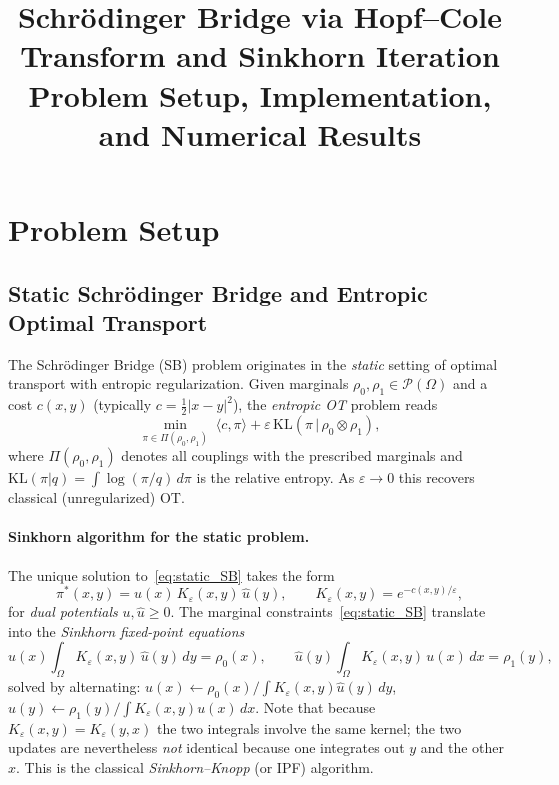 \documentclass[11pt,a4paper]{article}
\title{%
  \textbf{Schr\"{o}dinger Bridge via Hopf--Cole Transform and Sinkhorn Iteration}\\[6pt]
  \large Problem Setup, Implementation, and Numerical Results
}
\author{}
\date{}
\newcommand{\eps}{\varepsilon}
\begin{document}
\maketitle
\tableofcontents
\bigskip

\section{Problem Setup}

\subsection{Static Schr\"{o}dinger Bridge and Entropic Optimal Transport}

The Schr\"{o}dinger Bridge (SB) problem originates in the \emph{static}
setting of optimal transport with entropic regularization.
Given marginals $\rho_0, \rho_1 \in \mathcal{P}(\Omega)$ and a cost
$c(x,y)$ (typically $c = \tfrac{1}{2}|x-y|^2$), the
\emph{entropic OT} problem reads
\begin{equation}\label{eq:static_SB}
  \min_{\pi \in \Pi(\rho_0,\rho_1)}\;
    \langle c,\pi\rangle + \eps\,\mathrm{KL}(\pi\,|\,\rho_0\otimes\rho_1),
\end{equation}
where $\Pi(\rho_0,\rho_1)$ denotes all couplings with the prescribed
marginals and $\mathrm{KL}(\pi|q) = \int \log(\pi/q)\,d\pi$ is the
relative entropy.
As $\eps\to 0$ this recovers classical (unregularized) OT.

\paragraph{Sinkhorn algorithm for the static problem.}
The unique solution to~\eqref{eq:static_SB} takes the form
\begin{equation}\label{eq:static_factorization}
  \pi^*(x,y) = u(x)\,K_\eps(x,y)\,\hat{u}(y),
  \qquad K_\eps(x,y) = e^{-c(x,y)/\eps},
\end{equation}
for \emph{dual potentials} $u, \hat{u} \ge 0$.
The marginal constraints~\eqref{eq:static_SB} translate into the
\emph{Sinkhorn fixed-point equations}
\begin{equation}\label{eq:sinkhorn_static}
  u(x)\int_\Omega K_\eps(x,y)\,\hat{u}(y)\,dy = \rho_0(x),
  \qquad
  \hat{u}(y)\int_\Omega K_\eps(x,y)\,u(x)\,dx = \rho_1(y),
\end{equation}
solved by alternating:
$u(x) \leftarrow \rho_0(x)\big/\!\int K_\eps(x,y)\hat{u}(y)\,dy$,\;
$\hat{u}(y) \leftarrow \rho_1(y)\big/\!\int K_\eps(x,y)u(x)\,dx$.
Note that because $K_\eps(x,y) = K_\eps(y,x)$ the two integrals involve the
same kernel; the two updates are nevertheless \emph{not} identical because
one integrates out $y$ and the other $x$.
This is the classical \emph{Sinkhorn--Knopp} (or IPF) algorithm.
\end{document}
